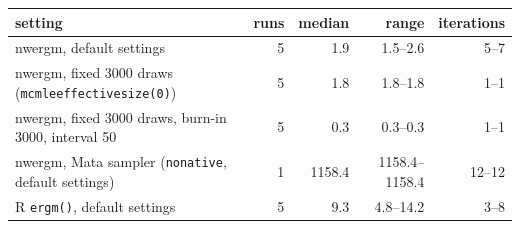 \begin{tabular}{@{}>{\raggedright\arraybackslash}p{7.4cm}rrrr@{}}\toprule
setting & runs & median & range & iterations\\\midrule
nwergm, default settings & 5 & 1.9 & 1.5--2.6 & 5--7\\
nwergm, fixed 3000 draws (\texttt{mcmleeffectivesize(0)}) & 5 & 1.8 & 1.8--1.8 & 1--1\\
nwergm, fixed 3000 draws, burn-in 3000, interval 50 & 5 & 0.3 & 0.3--0.3 & 1--1\\
nwergm, Mata sampler (\texttt{nonative}, default settings) & 1 & 1158.4 & 1158.4--1158.4 & 12--12\\
R \texttt{ergm()}, default settings & 5 & 9.3 & 4.8--14.2 & 3--8\\
\bottomrule\end{tabular}
